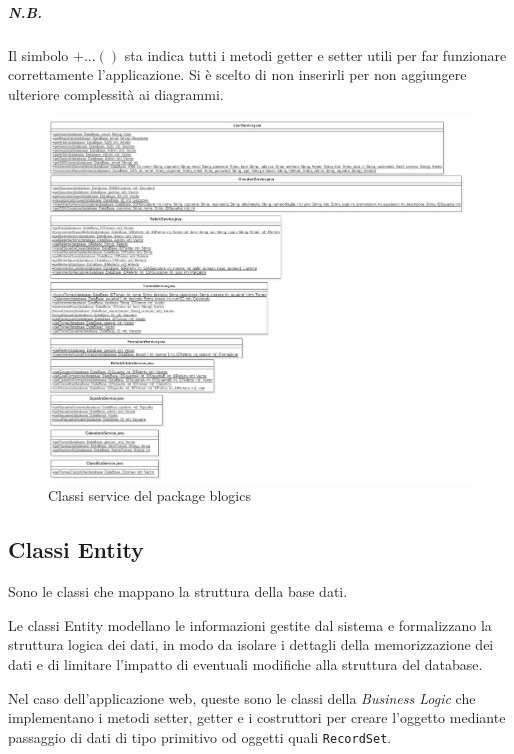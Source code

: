 	\subparagraph*{N.B.}
	Il simbolo $+...()$ sta indica tutti i metodi getter e setter utili per far funzionare correttamente l'applicazione. Si è scelto di non inserirli per non aggiungere ulteriore complessità ai diagrammi.
	
	\clearpage
	
	\begin{figure}[h]
		\centering
		\includegraphics[width=1\textwidth]
		{immagini/c-service-blogics}
		
		\caption{Classi service del package blogics}
	\end{figure}
	
	\subsection{Classi Entity}
	\label{c4:classi-entity}
	Sono le classi che mappano la struttura della base dati.
	
	Le classi Entity modellano le informazioni gestite dal sistema e formalizzano la struttura logica dei dati, in modo da isolare i dettagli della memorizzazione dei dati e di limitare l'impatto di eventuali modifiche alla struttura del database.
	
	Nel caso dell'applicazione web, queste sono le classi della \emph{Business Logic} che implementano i metodi setter, getter e i costruttori per creare l'oggetto mediante passaggio di dati di tipo primitivo od oggetti quali \texttt{RecordSet}.
	
